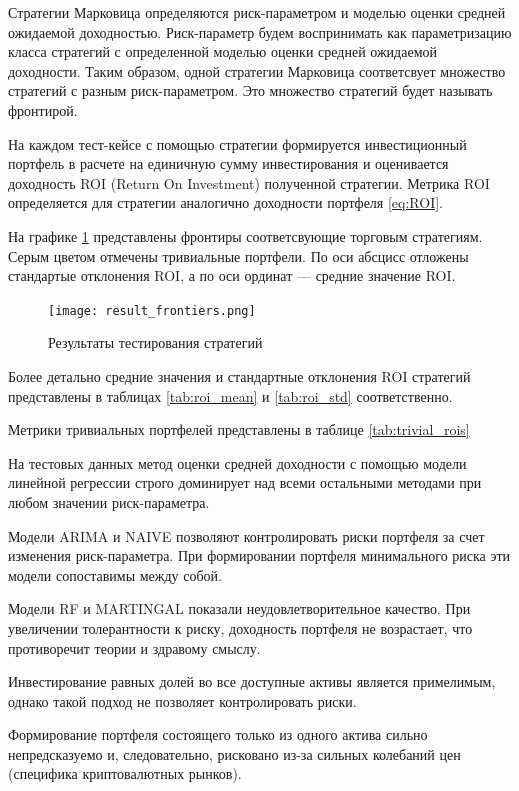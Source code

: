 Стратегии Марковица определяются риск-параметром и моделью оценки средней ожидаемой доходностью.
Риск-параметр будем воспринимать как параметризацию класса стратегий с определенной моделью оценки средней ожидаемой доходности.
Таким образом, одной стратегии Марковица соответсвует множество стратегий с разным риск-параметром. 
Это множество стратегий будет называть фронтирой.

На каждом тест-кейсе с помощью стратегии формируется инвестиционный портфель
в расчете на единичную сумму инвестирования и оценивается доходность ROI (Return On Investment) полученной стратегии.
Метрика ROI определяется для стратегии аналогично доходности портфеля \ref{eq:ROI}.

На графике \ref{fig:result_frontier} представлены фронтиры соответсвующие торговым стратегиям.
Серым цветом отмечены тривиальные портфели.
По оси абсцисс отложены стандартые отклонения ROI, а по оси ординат --- средние значение ROI.

\begin{figure}[H]
	\centering
	\texttt{[image: result\_frontiers.png]}
	\caption{Результаты тестирования стратегий}
	\label{fig:result_frontier}
\end{figure}

Более детально средние значения и стандартные отклонения ROI стратегий представлены в таблицах
\ref{tab:roi_mean} и \ref{tab:roi_std} соответственно.

Метрики тривиальных портфелей представлены в таблице \ref{tab:trivial_rois}







На тестовых данных метод оценки средней доходности с помощью модели линейной регрессии строго доминирует над всеми остальными методами
при любом значении риск-параметра. 

Модели ARIMA и NAIVE позволяют контролировать риски портфеля за счет изменения риск-параметра.
При формировании портфеля минимального риска эти модели сопоставимы между собой.

Модели RF и MARTINGAL показали неудовлетворительное качество. При увеличении толерантности к риску, доходность портфеля не возрастает,
что противоречит теории и здравому смыслу.

Инвестирование равных долей во все доступные активы является примелимым, однако такой подход не позволяет контролировать риски.

Формирование портфеля состоящего только из одного актива сильно непредсказуемо и, следовательно, рисковано 
из-за сильных колебаний цен (специфика криптовалютных рынков).
